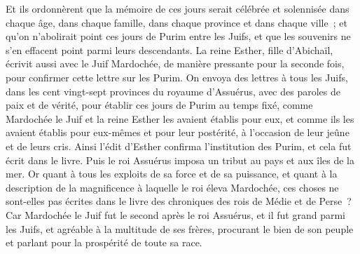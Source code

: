 \begin{multicols}{2}
Et ils ordonnèrent que la mémoire de ces jours serait célébrée et solennisée dans chaque âge, dans chaque famille, dans chaque province et dans chaque ville~; et qu'on n'abolirait point ces jours de Purim entre les Juifs, et que les souvenirs ne s'en effacent point parmi leurs descendants.
La reine Esther, fille d'Abichaïl, écrivit aussi avec le Juif Mardochée, de manière pressante pour la seconde fois, pour confirmer cette lettre sur les Purim.
On envoya des lettres à tous les Juifs, dans les cent vingt-sept provinces du royaume d'Assuérus, avec des paroles de paix et de vérité,
pour établir ces jours de Purim au temps fixé, comme Mardochée le Juif et la reine Esther les avaient établis pour eux, et comme ils les avaient établis pour eux-mêmes et pour leur postérité, à l'occasion de leur jeûne et de leurs cris.
Ainsi l'édit d'Esther confirma l'institution des Purim, et cela fut écrit dans le livre.
\VerseOne{}Puis le roi Assuérus imposa un tribut au pays et aux îles de la mer.
Or quant à tous les exploits de sa force et de sa puissance, et quant à la description de la magnificence à laquelle le roi éleva Mardochée, ces choses ne sont-elles pas écrites dans le livre des chroniques des rois de Médie et de Perse~?
Car Mardochée le Juif fut le second après le roi Assuérus, et il fut grand parmi les Juifs, et agréable à la multitude de ses frères, procurant le bien de son peuple et parlant pour la prospérité de toute sa race.
\PPE{}
\end{multicols}
